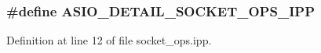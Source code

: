 \subsubsection[{A\+S\+I\+O\+\_\+\+D\+E\+T\+A\+I\+L\+\_\+\+S\+O\+C\+K\+E\+T\+\_\+\+O\+P\+S\+\_\+\+I\+P\+P}]{\setlength{\rightskip}{0pt plus 5cm}\#define A\+S\+I\+O\+\_\+\+D\+E\+T\+A\+I\+L\+\_\+\+S\+O\+C\+K\+E\+T\+\_\+\+O\+P\+S\+\_\+\+I\+P\+P}\label{socket__ops_8ipp_a8f18060db6a1196cc0c92c0514cc72b1}


Definition at line 12 of file socket\+\_\+ops.\+ipp.


